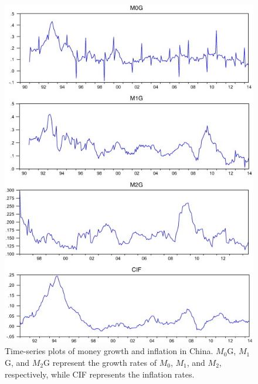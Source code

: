 \documentclass[a4paper,fleqn]{cas-sc}
\begin{document}
\begin{figure}[h]\label{fig:1}
    \centering
    \includegraphics[]{image/1.jpg}
    \caption{ Time-series plots of money growth and inflation in China. $M_0$G, $M_1$G, and $M_2$G represent the growth rates of $M_0$, $M_1$, and $M_2$, respectively, while CIF represents the inflation rates.}
\end{figure}
\end{document}
